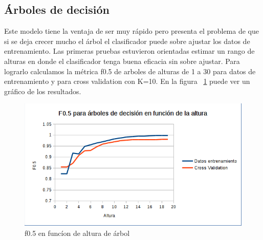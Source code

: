 \subsection{Árboles de decisión}

Este modelo tiene la ventaja de ser muy rápido pero presenta el problema de que si se deja crecer mucho el árbol el clasificador puede sobre ajustar los datos de entrenamiento. Las primeras pruebas estuvieron orientadas estimar un rango de alturas en donde el clasificador tenga buena eficacia sin sobre ajustar. Para lograrlo calculamos la métrica  f0.5 de arboles de alturas de 1 a 30 para datos de entrenamiento y para cross validation con K=10. En la figura ~\ref{fig:arboles_f05_en_funcion_altura} puede ver un gráfico de los resultados.

\begin{figure}[H]
    \centering
        \includegraphics[width=\textwidth]{plots/arboles_f05_en_funcion_altura.png}
        \caption{f0.5 en funcíon de altura de árbol}
        \label{fig:arboles_f05_en_funcion_altura}
\end{figure}

